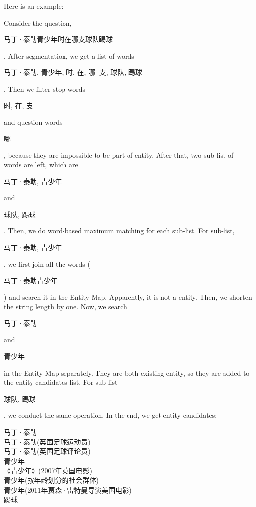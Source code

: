 \documentclass{llncs}
\begin{document}
Here is an example:

Consider the question, \begin{CJK}{UTF8}{gbsn}
马丁·泰勒青少年时在哪支球队踢球
\end{CJK}.
After segmentation, we get a list of words \begin{CJK}{UTF8}{gbsn}
马丁·泰勒, 青少年, 时, 在, 哪, 支, 球队, 踢球
\end{CJK}. Then we filter stop words \begin{CJK}{UTF8}{gbsn}
时, 在, 支
\end{CJK} and question words \begin{CJK}{UTF8}{gbsn}
哪
\end{CJK}, because they are impossible to be part of entity. After that, 
two sub-list of words are left, which are \begin{CJK}{UTF8}{gbsn}
马丁·泰勒, 青少年
\end{CJK} and \begin{CJK}{UTF8}{gbsn}
球队, 踢球
\end{CJK}. Then, we do word-based maximum matching for each sub-list. 
For sub-list, \begin{CJK}{UTF8}{gbsn}
马丁·泰勒, 青少年
\end{CJK}, we first join all the words (\begin{CJK}{UTF8}{gbsn}
马丁·泰勒青少年
\end{CJK}) and search it in the Entity Map. Apparently, it is not a entity. 
Then, we shorten the string length by one. Now, we search \begin{CJK}{UTF8}{gbsn}
马丁·泰勒
\end{CJK} and \begin{CJK}{UTF8}{gbsn}
青少年
\end{CJK} in the Entity Map separately. They are both existing entity, so they 
are added to the entity candidates list. For sub-list \begin{CJK}{UTF8}{gbsn}
球队, 踢球
\end{CJK}, we conduct the same operation. In the end, we get entity candidates: \\
\begin{CJK}{UTF8}{gbsn}
马丁·泰勒 \\ 
马丁·泰勒(英国足球运动员) \\ 
马丁·泰勒(英国足球评论员) \\
青少年 \\
《青少年》(2007年英国电影) \\ 
青少年(按年龄划分的社会群体) \\
青少年(2011年贾森·雷特曼导演美国电影) \\
踢球
\end{CJK}
\end{document}
